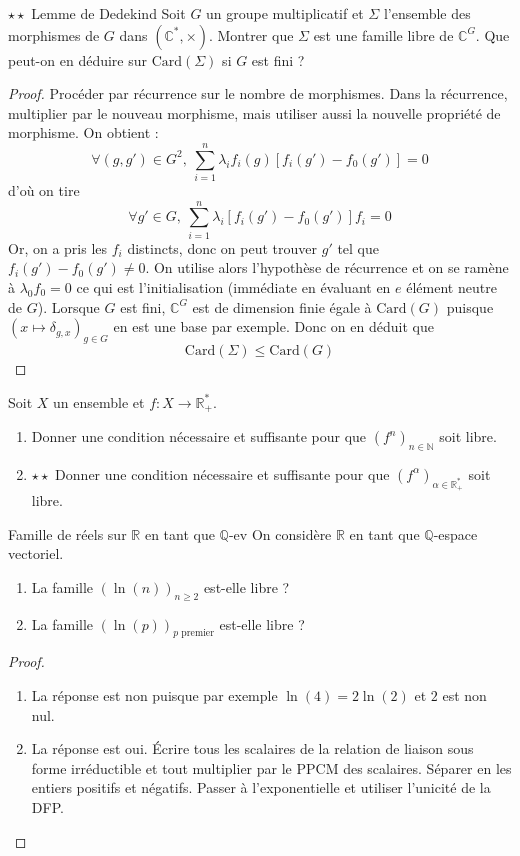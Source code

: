 \documentclass[french,a4paper]{article}
\newcommand{\N}{\mathbb{N}}
\newcommand{\Q}{\mathbb{Q}}
\newcommand{\R}{\mathbb{R}}
\newcommand{\C}{\mathbb{C}}
\newcommand{\st}{^*}
\theoremstyle{plain}
\theoremstyle{definition}
\theoremstyle{remark}
\begin{document}
\begin{ex}[Moulin.EV.15]{$\star\star$ Lemme de Dedekind}
	Soit $G$ un groupe multiplicatif et $\Sigma$ l'ensemble des morphismes de $G$ dans $(\C\st,\times)$. Montrer que $\Sigma$ est une famille libre de $\C^G$. Que peut-on en déduire sur $\text{Card}(\Sigma)$ si $G$ est fini ?
\end{ex}
\begin{proof}
	Procéder par récurrence sur le nombre de morphismes. Dans la récurrence, multiplier par le nouveau morphisme, mais utiliser aussi la nouvelle propriété de morphisme. On obtient : $$\forall(g,g')\in G^2,\ \sum_{i=1}^{n}\lambda_if_i(g)\left[f_i(g')-f_0(g')\right]=0$$ d'où on tire $$\forall g'\in G,\ \sum_{i=1}^{n}\lambda_i\left[f_i(g')-f_0(g')\right]f_i=0$$ Or, on a pris les $f_i$ distincts, donc on peut trouver $g'$ tel que $f_i(g')-f_0(g')\ne 0$. On utilise alors l'hypothèse de récurrence et on se ramène à $\lambda_0 f_0=0$ ce qui est l'initialisation (immédiate en évaluant en $e$ élément neutre de $G$). Lorsque $G$ est fini, $\C^G$ est de dimension finie égale à $\text{Card}(G)$ puisque $(x\mapsto \delta_{g,x})_{g\in G}$ en est une base par exemple. Donc on en déduit que $$\text{Card}(\Sigma)\leqslant\text{Card}(G)$$
\end{proof}

\begin{ex}[Moulin.EV.16]{}
	Soit $X$ un ensemble et $f:X\to\R_+\st$.
	\begin{enumerate}
		\item Donner une condition nécessaire et suffisante pour que $(f^n)_{n\in\N}$ soit libre.
		\item $\star\star$ Donner une condition nécessaire et suffisante pour que $(f^\alpha)_{\alpha\in\R_+\st}$ soit libre.
	\end{enumerate}
\end{ex}

\begin{ex}[Moulin.EV.17]{Famille de réels sur $\R$ en tant que $\Q$-ev}
	On considère $\R$ en tant que $\Q$-espace vectoriel.
	\begin{enumerate}
		\item La famille $(\ln(n))_{n\geqslant 2}$ est-elle libre ?
		\item La famille $(\ln(p))_{p\text{ premier}}$ est-elle libre ?
	\end{enumerate}
\end{ex}
\begin{proof}
	\begin{enumerate}
		\item La réponse est non puisque par exemple $\ln(4)=2\ln(2)$ et $2$ est non nul.
		\item La réponse est oui. Écrire tous les scalaires de la relation de liaison sous forme irréductible et tout multiplier par le PPCM des scalaires. Séparer en les entiers positifs et négatifs. Passer à l'exponentielle et utiliser l'unicité de la DFP.
	\end{enumerate}
\end{proof}
\end{document}
